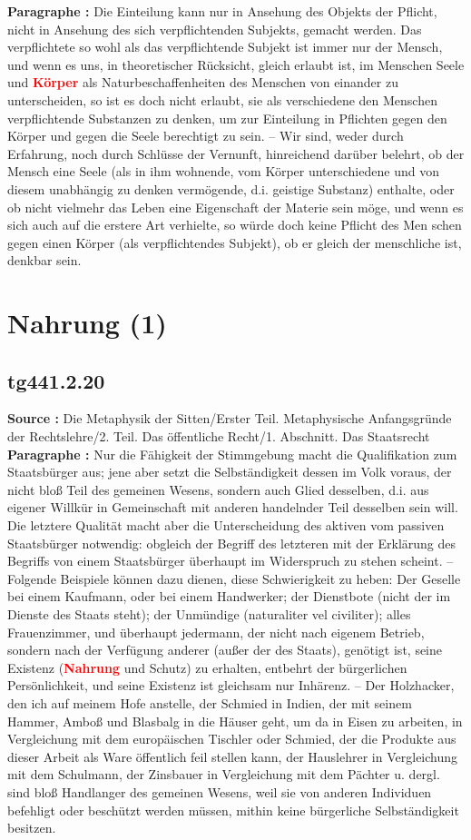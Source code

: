 \documentclass[a4paper,12pt,twoside]{book}
\newcommand{\match}[1]{\textcolor{red}{\textbf{#1}}}
\newcommand{\unnumberedsection}[1]{
	\section*{#1}
	\addcontentsline{toc}{section}{#1}
	\markright{#1}
}
\begin{document}
	\textbf{Paragraphe : }Die Einteilung kann nur in Ansehung des Objekts der Pflicht, nicht in Ansehung des sich verpflichtenden Subjekts, gemacht werden. Das verpflichtete so wohl als das verpflichtende Subjekt ist immer nur der Mensch, und wenn es uns, in theoretischer Rücksicht, gleich erlaubt ist, im Menschen Seele und \match{Körper} als Naturbeschaffenheiten des Menschen von einander zu unterscheiden, so ist es doch nicht erlaubt, sie als verschiedene den Menschen verpflichtende Substanzen zu denken, um zur Einteilung in Pflichten gegen den Körper und gegen die Seele berechtigt zu sein. – Wir sind, weder durch Erfahrung, noch durch Schlüsse der Vernunft, hinreichend darüber belehrt, ob der Mensch eine Seele (als in ihm wohnende, vom Körper unterschiedene und von diesem unabhängig zu denken vermögende, d.i. geistige Substanz) enthalte, oder ob nicht vielmehr das Leben eine Eigenschaft der Materie sein möge, und wenn es sich auch auf die erstere Art verhielte, so würde doch keine Pflicht des Men schen gegen einen Körper (als verpflichtendes Subjekt), ob er gleich der menschliche ist, denkbar sein. 
	
	\unnumberedsection{Nahrung (1)} 
	\subsection*{tg441.2.20} 
	\textbf{Source : }Die Metaphysik der Sitten/Erster Teil. Metaphysische Anfangsgründe der Rechtslehre/2. Teil. Das öffentliche Recht/1. Abschnitt. Das Staatsrecht\\  
	
	\textbf{Paragraphe : }Nur die Fähigkeit der Stimmgebung macht die Qualifikation zum Staatsbürger aus; jene aber setzt die Selbständigkeit dessen im Volk voraus, der nicht bloß Teil des gemeinen Wesens, sondern auch Glied desselben, d.i. aus eigener Willkür in Gemeinschaft mit anderen handelnder  Teil desselben sein will. Die letztere Qualität macht aber die Unterscheidung des aktiven vom passiven Staatsbürger notwendig: obgleich der Begriff des letzteren mit der Erklärung des Begriffs von einem Staatsbürger überhaupt im Widerspruch zu stehen scheint. – Folgende Beispiele können dazu dienen, diese Schwierigkeit zu heben: Der Geselle bei einem Kaufmann, oder bei einem Handwerker; der Dienstbote (nicht der im Dienste des Staats steht); der Unmündige (naturaliter vel civiliter); alles Frauenzimmer, und überhaupt jedermann, der nicht nach eigenem Betrieb, sondern nach der Verfügung anderer (außer der des Staats), genötigt ist, seine Existenz (\match{Nahrung} und Schutz) zu erhalten, entbehrt der bürgerlichen Persönlichkeit, und seine Existenz ist gleichsam nur Inhärenz. – Der Holzhacker, den ich auf meinem Hofe anstelle, der Schmied in Indien, der mit seinem Hammer, Amboß und Blasbalg in die Häuser geht, um da in Eisen zu arbeiten, in Vergleichung mit dem europäischen Tischler oder Schmied, der die Produkte aus dieser Arbeit als Ware öffentlich feil stellen kann, der Hauslehrer in Vergleichung mit dem Schulmann, der Zinsbauer in Vergleichung mit dem Pächter u. dergl. sind bloß Handlanger des gemeinen Wesens, weil sie von anderen Individuen befehligt oder beschützt werden müssen, mithin keine bürgerliche Selbständigkeit besitzen. 
	
\end{document}
